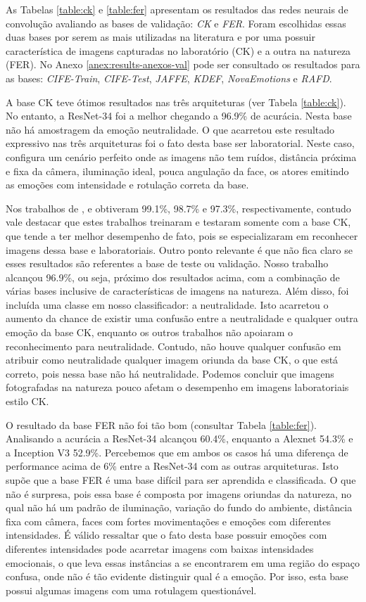 As Tabelas \ref{table:ck} e \ref{table:fer} apresentam os resultados das redes neurais de convolução avaliando as bases de validação: \textit{CK} e \textit{FER}. Foram escolhidas essas duas bases por serem as mais utilizadas na literatura e por uma possuir característica de imagens capturadas no laboratório (CK) e a outra na natureza (FER). No Anexo \ref{anex:results-anexos-val} pode ser consultado os resultados para as bases: \textit{CIFE-Train}, \textit{CIFE-Test}, \textit{JAFFE}, \textit{KDEF}, \textit{NovaEmotions} e \textit{RAFD}. 

A base CK teve ótimos resultados nas três arquiteturas (ver Tabela \ref{table:ck}). No entanto, a ResNet-34 foi a melhor chegando a 96.9\% de acurácia. Nesta base não há amostragem da emoção neutralidade. O que acarretou este resultado expressivo nas três arquiteturas foi o fato desta base ser laboratorial. Neste caso, configura um cenário perfeito onde as imagens não tem ruídos, distância próxima e fixa da câmera, iluminação ideal, pouca angulação da face, os atores emitindo as emoções com intensidade e rotulação correta da base. 

Nos trabalhos de \cite{art1}, \cite{art11} e \cite{art7} obtiveram  99.1\%, 98.7\% e 97.3\%, respectivamente, contudo vale destacar que estes trabalhos treinaram e testaram somente com a base CK, que tende a ter melhor desempenho de fato, pois se especializaram em reconhecer imagens dessa base e laboratoriais. Outro ponto relevante é que não fica claro se esses resultados são referentes a base de teste ou validação. Nosso trabalho alcançou 96.9\%, ou seja, próximo dos resultados acima, com a combinação de várias bases inclusive de características de imagens na natureza. Além disso, foi incluída uma classe em nosso classificador: a neutralidade. Isto acarretou o aumento da chance de existir uma confusão entre a neutralidade e qualquer outra emoção da base CK, enquanto os outros trabalhos não apoiaram o reconhecimento para neutralidade. Contudo, não houve qualquer confusão em atribuir como neutralidade qualquer imagem oriunda da base CK, o que está correto, pois nessa base não há neutralidade. Podemos concluir que imagens fotografadas na natureza pouco afetam o desempenho em imagens laboratoriais estilo CK. 

O resultado da base FER não foi tão bom (consultar Tabela \ref{table:fer}). Analisando a acurácia a ResNet-34 alcançou 60.4\%, enquanto a Alexnet 54.3\% e a Inception V3 52.9\%. Percebemos que em ambos os casos há uma diferença de performance acima de 6\% entre a ResNet-34 com as outras arquiteturas. Isto supõe que a base FER é uma base difícil para ser aprendida e classificada. O que não é surpresa, pois essa base é composta por imagens oriundas da natureza, no qual não há um padrão de iluminação, variação do fundo do ambiente, distância fixa com câmera, faces com fortes movimentações e emoções com diferentes intensidades. É válido ressaltar que o fato desta base possuir emoções com diferentes intensidades pode acarretar imagens com baixas intensidades emocionais, o que leva essas instâncias a se encontrarem em uma região do espaço confusa, onde não é tão evidente distinguir qual é a emoção. Por isso, esta base possui algumas imagens com uma rotulagem questionável.   

